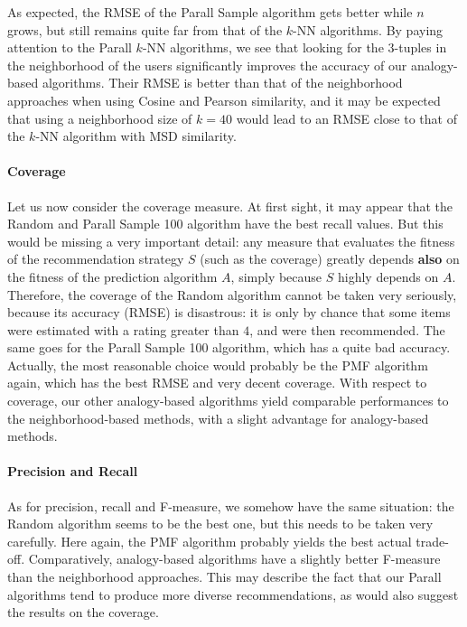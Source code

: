 As expected, the RMSE of the
Parall Sample algorithm gets better while $n$ grows, but still
remains quite far from that of the $k$-NN algorithms. By paying attention to
the Parall $k$-NN algorithms, we see that looking for the
$3$-tuples in the neighborhood of the users significantly improves the
accuracy of our analogy-based algorithms. Their RMSE is better than that of the
neighborhood approaches when using Cosine and Pearson similarity, and it may
be expected that using a neighborhood size of $k=40$ would lead to an RMSE
close to that of the $k$-NN algorithm with MSD similarity.

\paragraph{Coverage\\}

Let us now consider the coverage measure. At first sight, it may appear that
the Random and Parall Sample 100 algorithm have the best recall values. But this
would be missing a very important detail: any measure that evaluates the
fitness of the recommendation strategy $S$ (such as the coverage) greatly
depends \textbf{also} on the fitness of the prediction algorithm $A$, simply
because $S$ highly depends on $A$. Therefore, the coverage of the Random
algorithm cannot be taken very seriously, because its accuracy (RMSE) is
disastrous: it  is only by chance that some items were estimated with a rating
greater than $4$, and were then recommended. The same goes for the Parall
Sample 100 algorithm, which has a quite bad accuracy.  Actually, the most
reasonable choice would probably be the PMF algorithm again, which has the best
RMSE and very decent coverage. With respect to coverage, our other
analogy-based algorithms yield comparable performances to the
neighborhood-based methods, with a slight advantage for analogy-based methods.

\paragraph{Precision and Recall\\}

As for precision, recall and F-measure, we somehow have the same situation: the
Random algorithm seems to be the best one, but this needs to be taken very
carefully. Here again, the PMF algorithm probably yields the best actual trade-off.
Comparatively, analogy-based algorithms have a slightly better F-measure than
the neighborhood approaches. This may describe the fact that our Parall algorithms
tend to produce more diverse recommendations, as would also suggest the results
on the coverage.

